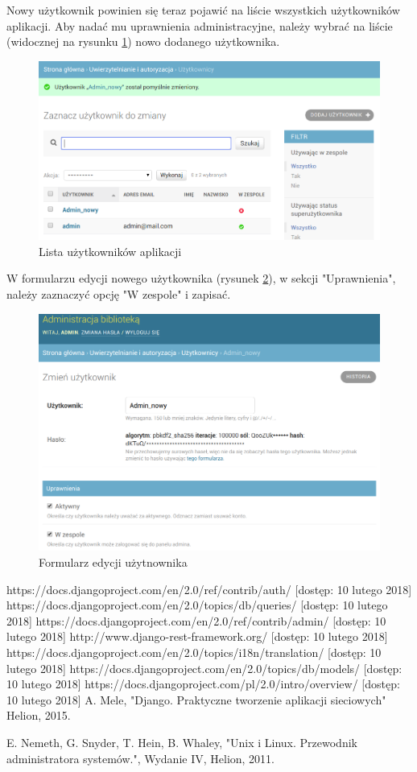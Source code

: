 \documentclass[twoside]{projektInzynierskiMS}
\begin{document}
\newpage

Nowy użytkownik powinien się teraz pojawić na liście wszystkich użytkowników aplikacji. Aby nadać mu uprawnienia administracyjne, należy wybrać na liście (widocznej na rysunku \ref{fig:usersList}) nowo dodanego użytkownika.

\begin{figure}[h]
  \centering
  \includegraphics[width=0.6\linewidth]{img/ListaUser.png}
  \caption{Lista użytkowników aplikacji}
  \label{fig:usersList}
\end{figure}

W formularzu edycji nowego użytkownika (rysunek \ref{fig:editUser}), w sekcji "Uprawnienia", należy zaznaczyć opcję "W zespole" i zapisać.

\begin{figure}[h]
  \centering
  \includegraphics[width=0.6\linewidth]{img/Uprawnienia.png}
  \caption{Formularz edycji użytnownika}
  \label{fig:editUser}
\end{figure}

\begin{thebibliography}{12}
 https://docs.djangoproject.com/en/2.0/ref/contrib/auth/ [dostęp: 10 lutego 2018]
 https://docs.djangoproject.com/en/2.0/topics/db/queries/ [dostęp: 10 lutego 2018]
 https://docs.djangoproject.com/en/2.0/ref/contrib/admin/ [dostęp: 10 lutego 2018]
 http://www.django-rest-framework.org/  [dostęp: 10 lutego 2018]
 https://docs.djangoproject.com/en/2.0/topics/i18n/translation/ [dostęp: 10 lutego 2018]
 https://docs.djangoproject.com/en/2.0/topics/db/models/ [dostęp: 10 lutego 2018]
 https://docs.djangoproject.com/pl/2.0/intro/overview/ [dostęp: 10 lutego 2018]
 A. Mele, "Django. Praktyczne tworzenie aplikacji sieciowych" Helion, 2015.

 E. Nemeth, G. Snyder, T. Hein, B. Whaley, "Unix i Linux. Przewodnik
administratora systemów.", Wydanie IV, Helion, 2011.


\end{thebibliography}
\end{document}
